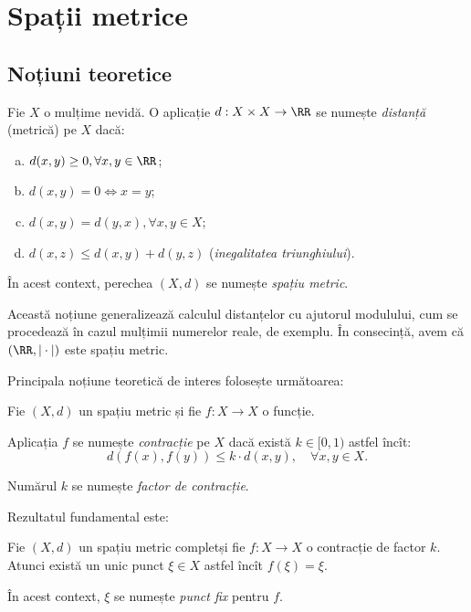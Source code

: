 
\chapter{Spații metrice}

\section{Noțiuni teoretice}

\begin{definition}\label{def:sp-metric}
  Fie $ X $ o mulțime nevidă. O aplicație $ d : X \times X \to \RR $
  se numește \emph{distanță} (metrică) pe $ X $ dacă:
  \begin{enumerate}[(a)]
  \item $ d(x, y) \geq 0, \forall x, y \in \RR $;
  \item $ d(x, y) = 0 \Leftrightarrow x = y $;
  \item $ d(x, y) = d(y, x), \forall x, y \in X $;
  \item $ d(x, z) \leq d(x, y) + d(y, z) $ (\emph{inegalitatea triunghiului}).
  \end{enumerate}

  În acest context, perechea $ (X, d) $ se numește \emph{spațiu metric}.
\end{definition}

Această noțiune generalizează calculul distanțelor cu ajutorul modulului,
cum se procedează în cazul mulțimii numerelor reale, de exemplu. În consecință,
avem că $ (\RR, |\cdot|) $ este spațiu metric.

Principala noțiune teoretică de interes folosește următoarea:
\begin{definition}\label{def:contractie}
  Fie $ (X, d) $ un spațiu metric și fie $ f: X \to X $ o funcție.

  Aplicația $ f $ se numește \emph{contracție} pe $ X $ dacă există
  $ k \in [0, 1) $ astfel încît:
  \[
    d(f(x), f(y)) \leq k \cdot d(x, y), \quad \forall x, y \in X.
  \]

  Numărul $ k $ se numește \emph{factor de contracție}.
\end{definition}

Rezultatul fundamental este:

\begin{theorem}[Banach]\label{thm:banach}
  Fie $ (X, d) $ un spațiu metric complet\footnotemark și fie $ f : X \to X $
  o contracție de factor $ k $. Atunci există un unic punct $ \xi \in X $
  astfel încît $ f(\xi) = \xi $.

  În acest context, $ \xi $ se numește \emph{punct fix} pentru $ f $.
\end{theorem}

